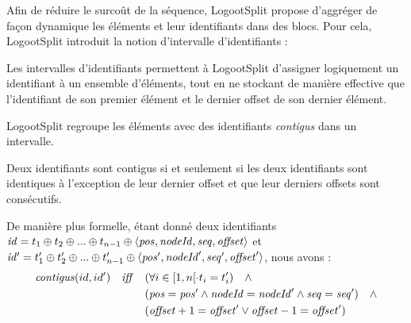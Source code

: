 \label{sec:blocs}

Afin de réduire le surcoût de la séquence, LogootSplit propose d'aggréger de façon dynamique les éléments et leur identifiants dans des blocs.
Pour cela, LogootSplit introduit la notion d'intervalle d'identifiants :

\noindent{}

Les intervalles d'identifiants permettent à LogootSplit d'assigner logiquement un identifiant à un ensemble d'éléments, tout en ne stockant de manière effective que l'identifiant de son premier élément et le dernier offset de son dernier élément.

LogootSplit regroupe les éléments avec des identifiants \emph{contigus} dans un intervalle.
\begin{definition}
  Deux identifiants sont contigus si et seulement si les deux identifiants sont identiques à l'exception de leur dernier offset et que leur derniers offsets sont consécutifs.

  De manière plus formelle, étant donné deux identifiants $\mathit{id} = t_1 \oplus t_2 \oplus ... \oplus t_{n-1} \oplus \langle \mathit{pos},\mathit{nodeId},\mathit{seq},\mathit{offset} \rangle$ et $\mathit{id'} = t^\prime_1 \oplus t^\prime_2 \oplus ... \oplus t^\prime_{n-1} \oplus \langle \mathit{pos}',\mathit{nodeId}',\mathit{seq}',\mathit{offset}' \rangle$, nous avons :
  \begin{equation*}
    \begin{split}
      \mathit{contigus}(id,id') \quad \mathit{iff} \quad     & (\forall i \in [1,n[ \cdot t_i = t'_i) \quad \land \\
                                            & (\mathit{pos} = \mathit{pos}' \land \mathit{nodeId} = \mathit{nodeId}' \land \mathit{seq} = \mathit{seq}') \quad \land \\
                                            & (\mathit{offset} + 1 = \mathit{offset}' \lor \mathit{offset} - 1 = \mathit{offset}') \\
    \end{split}
  \end{equation*}

\end{definition}

